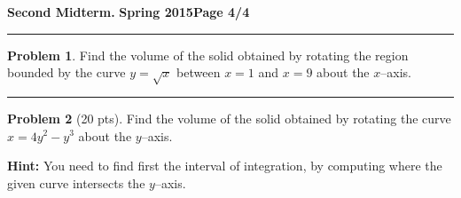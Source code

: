 \documentclass[12pt]{article}
\theoremstyle{definition}
\newtheorem{problem}{Problem}
\begin{document}
\hfill{\large\bf Second Midterm.}\hfill{\large\bf
  Spring 2015}\hfill{\large\bf Page 4/4}\hrule

\bigskip
\begin{problem}
Find the volume of the solid obtained by rotating the region bounded by the curve $y=\sqrt{x}$ between $x=1$ and $x=9$ about the $x$--axis.
\vspace{8cm}
\begin{flushright}
\end{flushright}
\end{problem}
\hrule
\begin{problem}[20 pts]
Find the volume of the solid obtained by rotating the curve $x=4y^2-y^3$ about the $y$--axis.

\noindent\textbf{Hint:} You need to find first the interval of integration, by computing where the given curve intersects the $y$--axis.
\vspace{8.5cm}
\begin{flushright}
\end{flushright}
\end{problem}
\end{document}
